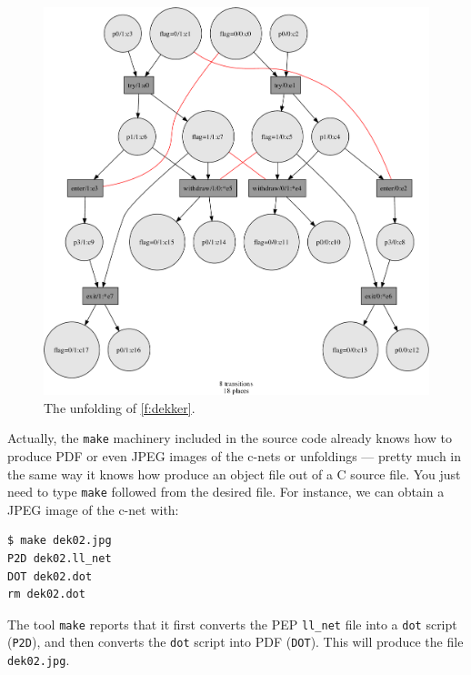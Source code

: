\documentclass[a4paper]{refart}
\begin{document}
\begin{figure}[bth]
\centering
\includegraphics[scale=0.25]{fig/dek02-unf.pdf}
\caption{The unfolding of \cref{f:dekker}.}
\label{f:dek02unf}
\end{figure}

Actually, the \verb!make! machinery included in the source code already
knows how to produce PDF or even JPEG images of the c-nets
or unfoldings --- pretty much in the same way it knows how produce an
object file out of a C source file.
You just need to type \verb!make! followed from the desired file.
For instance, we can obtain a JPEG image of the c-net with:
\begin{verbatim}
$ make dek02.jpg
P2D dek02.ll_net
DOT dek02.dot
rm dek02.dot
\end{verbatim}
The tool \verb!make! reports that it first converts
the PEP \verb!ll_net! file into a \verb!dot! script (\verb!P2D!),
and then converts the \verb!dot! script into PDF (\verb!DOT!).
This will produce the file \verb!dek02.jpg!.
\end{document}
